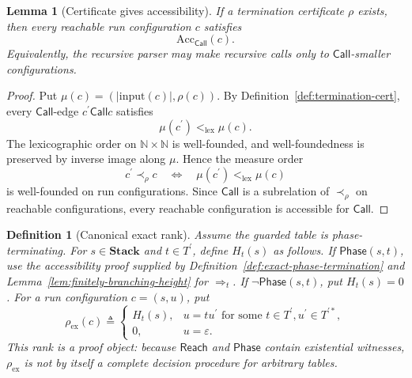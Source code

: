 \documentclass[11pt,a4paper]{article}
\theoremstyle{prettyplain}
\newtheorem{lemma}[theorem]{Lemma}
\theoremstyle{prettydef}
\newtheorem{definition}[theorem]{Definition}
\newcommand{\eps}{\varepsilon}
\begin{document}
\begin{lemma}[Certificate gives accessibility]\label{lem:termination-cert-acc}
If a termination certificate \(\rho\) exists, then every reachable run
configuration \(c\) satisfies
\[
\mathrm{Acc}_{\mathsf{Call}}(c).
\]
Equivalently, the recursive parser may make recursive calls only to
\(\mathsf{Call}\)-smaller configurations.
\end{lemma}

\begin{proof}
Put \(\mu(c)=(|\mathrm{input}(c)|,\rho(c))\).  By
Definition~\ref{def:termination-cert}, every \(\mathsf{Call}\)-edge
\(c^\prime\mathrel{\mathsf{Call}}c\) satisfies
\[
\mu(c^\prime)<_{\mathrm{lex}}\mu(c).
\]
The lexicographic order on \(\mathbb N\times\mathbb N\) is well-founded, and
well-foundedness is preserved by inverse image along \(\mu\).  Hence the measure
order
\[
c^\prime\prec_\rho c
\quad\Longleftrightarrow\quad
\mu(c^\prime)<_{\mathrm{lex}}\mu(c)
\]
is well-founded on run configurations.  Since \(\mathsf{Call}\) is a subrelation
of \(\prec_\rho\) on reachable configurations, every reachable configuration is
accessible for \(\mathsf{Call}\).
\end{proof}

\begin{definition}[Canonical exact rank]\label{def:canonical-exact-rank}
Assume the guarded table is phase-terminating.  For \(s\in\mathbf{Stack}\) and
\(t\in T^\prime\), define \(H_t(s)\) as follows.  If \(\mathsf{Phase}(s,t)\), use
the accessibility proof supplied by Definition~\ref{def:exact-phase-termination}
and Lemma~\ref{lem:finitely-branching-height} for \(\Rightarrow_t\).  If
\(\neg\mathsf{Phase}(s,t)\), put \(H_t(s)=0\).  For a run configuration
\(c=(s,u)\), put
\[
\rho_{\mathrm{ex}}(c)
\triangleq
\begin{cases}
H_t(s),&u=t u^\prime\text{ for some }t\in T^\prime,
                         u^\prime\in T^{\prime *},\\[2pt]
0,&u=\eps.
\end{cases}
\]
This rank is a proof object: because \(\mathsf{Reach}\) and \(\mathsf{Phase}\)
contain existential witnesses, \(\rho_{\mathrm{ex}}\) is not by itself a complete
decision procedure for arbitrary tables.
\end{definition}
\end{document}
